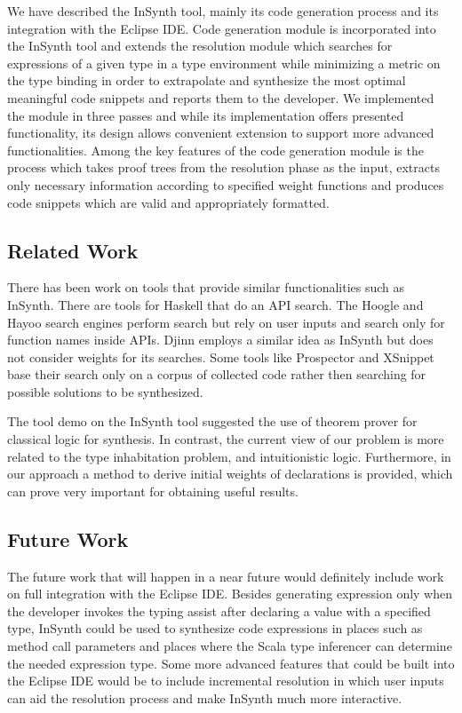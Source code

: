 We have described the InSynth tool, mainly its code generation process and its integration with the Eclipse IDE. 
Code generation module is incorporated into the InSynth tool and extends the resolution module which searches for expressions of a given type in a type environment while minimizing a metric on the type binding in order to extrapolate and synthesize the most optimal meaningful code snippets and reports them to the developer.
We implemented the module in three passes and while its implementation offers presented functionality, its design allows convenient extension to support more advanced functionalities.   
Among the key features of the code generation module is the process which takes proof trees from the resolution phase as the input, extracts only necessary information according to specified weight functions and produces code snippets which are valid and appropriately formatted.  

\subsection{Related Work}

There has been work on tools that provide similar functionalities such as InSynth.
There are tools for Haskell that do an API search. The Hoogle \cite{Hoogle} and Hayoo \cite{Hayoo} search engines perform search but rely on user inputs and search only for function names inside APIs. Djinn \cite{Djinn} employs a similar idea as InSynth but does not consider weights for its searches.
Some tools like Prospector \cite{Mandelin:2005:JMH:1065010.1065018} and XSnippet \cite{Sahavechaphan:2006:XMS:1167515.1167508} base their search only on a corpus of collected code rather then searching for possible solutions to be synthesized.

The tool demo on the InSynth tool \cite{demo_paper} suggested the use of theorem prover for classical logic for synthesis. 
In contrast, the current view of our problem is more related to the type inhabitation problem, and intuitionistic logic.
Furthermore, in our approach a method to derive initial weights of declarations is provided, which can prove very important for obtaining useful results.

\subsection{Future Work}

The future work that will happen in a near future would definitely include work on full integration with the Eclipse IDE.
Besides generating expression only when the developer invokes the typing assist after declaring a value with a specified type, InSynth could be used to synthesize code expressions in places such as method call parameters and places where the Scala type inferencer can determine the needed expression type.
Some more advanced features that could be built into the Eclipse IDE would be to include incremental resolution in which user inputs can aid the resolution process and make InSynth much more interactive.

